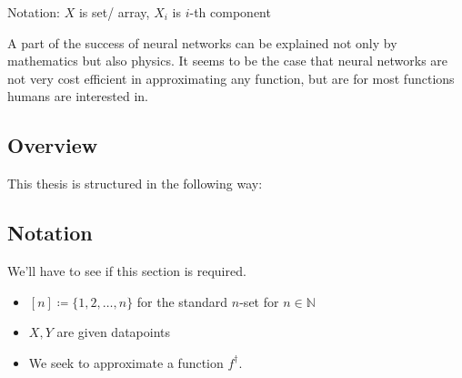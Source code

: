 Notation: $X$ is set/ array, $X_i$ is $i$-th component

A part of the success of neural networks can be explained not only by mathematics but also physics.
It seems to be the case that neural networks are not very cost efficient in approximating any function, but are for most functions humans are interested in.



\subsection{Overview}
This thesis is structured in the following way:

\subsection{Notation}
We'll have to see if this section is required.
\begin{itemize}
	\item $[n] \coloneqq \{1, 2, \ldots, n\}$ for the standard $n$-set for $n \in \mathbb{N}$
	\item $X, Y$ are given datapoints
	\item We seek to approximate a function $f^\dagger$.
\end{itemize}